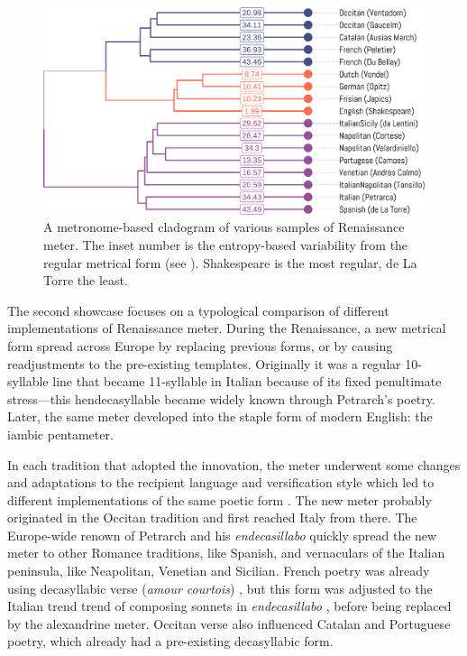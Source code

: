 \documentclass[
    hf
]{ceurart}
\begin{document}
\begin{figure}
    \includegraphics[width=\linewidth]{figures/ren_dendro-crop.pdf}
    \caption{A metronome-based cladogram of various samples of Renaissance meter. The inset number is the entropy-based variability from the regular metrical form (see \cite{sela_measuring_2022}). Shakespeare is the most regular, de La Torre the least.}
    \label{fig:ren_dendro}
\end{figure}

The second showcase focuses on a typological comparison of different implementations of Renaissance meter. During the Renaissance, a new metrical form  spread across Europe by replacing previous forms, or by causing readjustments to the pre-existing templates. Originally it was a regular 10-syllable line that became 11-syllable in Italian because of its fixed penultimate stress---this hendecasyllable became widely known through Petrarch's poetry. Later, the same meter developed into the staple form of modern English: the iambic pentameter.

In each tradition that adopted the innovation, the meter underwent some changes and adaptations to the recipient language and versification style which led to different implementations of the same poetic form \cite{de_sisto_interaction_2020}. The new meter probably originated in the Occitan tradition \cite{beltrami_cesura_1986, di_girolamo_i_1999, billy_linvention_2000} and first reached Italy from there. The Europe-wide renown of Petrarch and his \textit{endecasillabo} quickly spread the new meter to other Romance traditions, like Spanish, and vernaculars of the Italian peninsula, like Neapolitan, Venetian and Sicilian. French poetry was already using decasyllabic verse (\textit{amour courtois}) \cite{hudson_short_1919}, but this form was adjusted to the Italian trend trend of composing sonnets in \textit{endecasillabo} \cite{hudson_short_1919,key_short_2006}, before being replaced by the alexandrine meter. Occitan verse also influenced Catalan and Portuguese poetry, which already had a pre-existing decasyllabic form.
\end{document}

